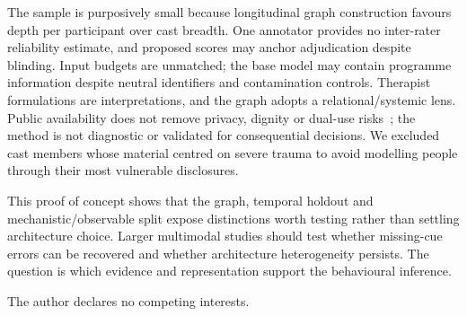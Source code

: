\documentclass{article}
\begin{document}
The sample is purposively small because longitudinal graph construction favours depth per
participant over cast breadth. One annotator provides no inter-rater reliability estimate, and
proposed scores may anchor adjudication despite blinding. Input budgets are unmatched; the base
model may contain programme information despite neutral identifiers and contamination controls.
Therapist formulations are interpretations, and the graph adopts a relational/systemic lens.
Public availability does not remove privacy, dignity or dual-use risks~\cite{anzola2022ethics}; the method is
not diagnostic or validated for consequential decisions. We excluded cast members whose material
centred on severe trauma to avoid modelling people through their most vulnerable disclosures.

This proof of concept shows that the graph, temporal holdout and mechanistic/observable split
expose distinctions worth testing rather than settling architecture choice. Larger multimodal
studies should test whether missing-cue errors can be recovered and whether architecture
heterogeneity persists. The question is which evidence and representation support the behavioural
inference.

\begin{ack}
The author declares no competing interests.
\end{ack}

\end{document}
